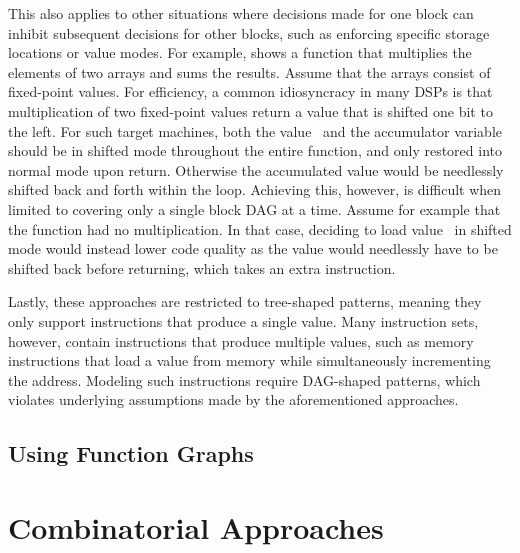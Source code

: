 This also applies to other situations where decisions made for one \gls{block}
can inhibit subsequent decisions for other \glspl{block}, such as enforcing
specific storage locations or value modes.
%
For example,  shows a \gls{function} that
multiplies the elements of two arrays and sums the results.
%
Assume that the arrays consist of fixed-point values.
%
For efficiency, a common idiosyncracy in many \glspl{DSP} is that multiplication
of two fixed-point values return a value that is shifted one bit to the left.
%
For such \glspl{target machine}, both the value~ and the accumulator
variable~ should be in shifted mode throughout the entire
\gls{function}, and only restored into normal mode upon return.
%
Otherwise the accumulated value would be needlessly shifted back and forth
within the loop.
%
Achieving this, however, is difficult when limited to covering only a single
\gls{block DAG} at a time.
%
Assume for example that the function had no multiplication.
%
In that case, deciding to load value~ in shifted mode would instead
lower code quality as the value would needlessly have to be shifted back before
returning, which takes an extra \gls{instruction}.

Lastly, these approaches are restricted to tree-shaped \glspl{pattern},
meaning they only support \glspl{instruction} that produce a single value.
%
Many \glspl{instruction set}, however, contain \glspl{instruction} that produce
multiple values, such as memory \glspl{instruction} that load a value from
memory while simultaneously incrementing the address.
%
Modeling such \glspl{instruction} require \gls{DAG}-shaped \glspl{pattern},
which violates underlying assumptions made by the aforementioned approaches.



\subsection{Using Function Graphs}






\section{Combinatorial Approaches}

